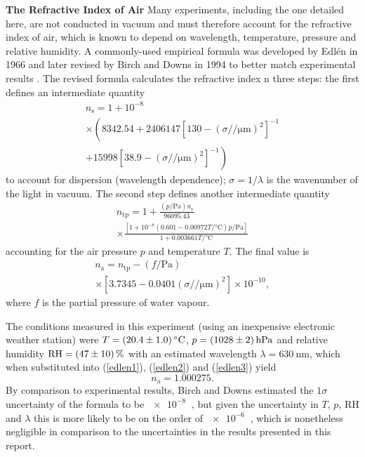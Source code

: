 \documentclass[
    aps,
    prl,
    reprint,
    10pt,
    amsmath,
    amssymb,
    a4paper,
    longbibliography
]{revtex4-2}
\begin{document}
\textbf{The Refractive Index of Air} \newline
Many experiments, including the one detailed here, are not conducted in
vacuum and must therefore account for the refractive index of air, which
is known to depend on wavelength, temperature, pressure and relative
humidity. A commonly-used empirical formula was developed by Edl{\'e}n
in 1966 and later revised by Birch and Downs in 1994 to better match
experimental results \cite{birchdowns}. The revised formula calculates
the refractive index n three steps: the first defines an intermediate
quantity
\begin{multline}
    n_\mathrm{s} = 1 + 10^{-8} \\
    \times \left(
        8342.54
        + 2406147 \left[
            130 - \left(\sigma / \si{\per\micro\meter}\right)^2
        \right]^{-1} \right. \\
        \left. + 15998 \left [
            38.9 - \left(\sigma / \si{\per\micro\meter}\right)^2
        \right]^{-1}
    \right)
    \label{edlen1}
\end{multline}
to account for dispersion (wavelength dependence);
$\sigma = 1/\lambda$ is the
wavenumber of the light in vacuum. The second step defines another
intermediate quantity
\begin{multline}
    n_\mathrm{tp} = 1 + \frac{(p / \si{\pascal})n_\mathrm{s}}{96095.43} \\
    \times \frac{
        \left[
            1 + 10^{-8} (0.601 - 0.00972 T / \si{\celsius})p / \si{\pascal}
        \right]
    }{
        1 + 0.003661 T / \si{\celsius}
    }
    \label{edlen2}
\end{multline}
accounting for the air pressure $p$ and temperature $T$. The final value
is
\begin{multline}
    n_\mathrm{a} = n_\mathrm{tp} - (f/\si{\pascal}) \\
    \times \left [
            3.7345 - 0.0401 \left(\sigma / \si{\per\micro\meter}\right)^2
    \right] \times 10^{-10},
    \label{edlen3}
\end{multline}
where $f$ is the partial pressure of water vapour.

The conditions measured in this experiment (using an inexpensive electronic
weather station) were
$T = \SI{20.4 \pm 1}{\celsius}$,
$p = \SI{1028 \pm 2}{\hecto\pascal}$ and
relative humidity $\mathrm{RH} = \SI{47 \pm 10}{\percent}$
with an estimated wavelength $\lambda = \SI{630}{\nano\meter}$, which when
substituted into (\ref{edlen1}), (\ref{edlen2}) and (\ref{edlen3})
yield
\begin{equation}
    n_\mathrm{a} = 1.000275.
\end{equation}
By comparison to experimental results, Birch and Downs estimated the
$1\sigma$ uncertainty of the formula to be $\SI{e-8}{}$ \cite{birchdowns},
but given the uncertainty in $T$, $p$, $\mathrm{RH}$ and $\lambda$ this is
more likely to be on the order of $\SI{e-6}{}$ \cite{emtoolbox}, which
is nonetheless negligible in comparison to the uncertainties in the
results presented in this report.
\end{document}
